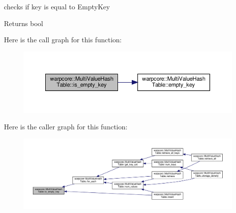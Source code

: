 checks if {\ttfamily key} is equal to {\ttfamily Empty\+Key} 

\begin{DoxyReturn}{Returns}
{\ttfamily bool} 
\end{DoxyReturn}
Here is the call graph for this function\+:
\nopagebreak
\begin{figure}[H]
\begin{center}
\leavevmode
\includegraphics[width=350pt]{classwarpcore_1_1MultiValueHashTable_a23d1ba2d5e85a2465685f353ee5d0872_cgraph}
\end{center}
\end{figure}
Here is the caller graph for this function\+:
\nopagebreak
\begin{figure}[H]
\begin{center}
\leavevmode
\includegraphics[width=350pt]{classwarpcore_1_1MultiValueHashTable_a23d1ba2d5e85a2465685f353ee5d0872_icgraph}
\end{center}
\end{figure}
\mbox{\label{classwarpcore_1_1MultiValueHashTable_a44f45da1cebbcc45a01072d4d22514ba}} 
